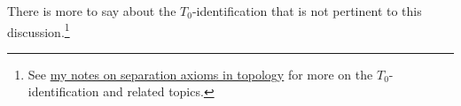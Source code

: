 \documentclass[article, a4paper, 11pt, oneside]{memoir}
\numberwithin{equation}{chapter}
\begin{document}
There is more to say about the $T_0$-identification that is not pertinent to this discussion.\footnote{See \href{https://github.com/dnhansen/topology-separation-axioms}{my notes on separation axioms in topology} for more on the $T_0$-identification and related topics.}








\end{document}
